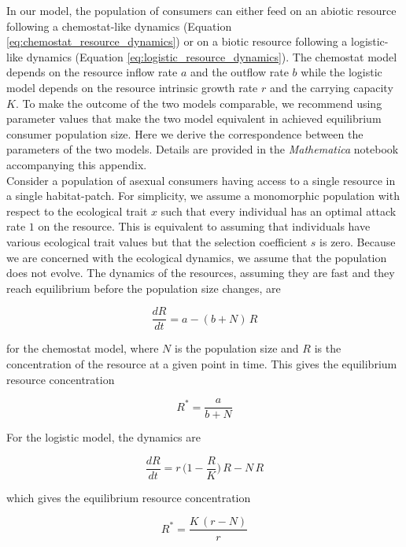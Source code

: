 In our model, the population of consumers can either feed on an abiotic resource following a chemostat-like dynamics (Equation \ref{eq:chemostat_resource_dynamics}) or on a biotic resource following a logistic-like dynamics (Equation \ref{eq:logistic_resource_dynamics}). The chemostat model depends on the resource inflow rate $a$ and the outflow rate $b$ while the logistic model depends on the resource intrinsic growth rate $r$ and the carrying capacity $K$. To make the outcome of the two models comparable, we recommend using parameter values that make the two model equivalent in achieved equilibrium consumer population size. Here we derive the correspondence between the parameters of the two models. Details are provided in the \textit{Mathematica} notebook accompanying this appendix.\\

Consider a population of asexual consumers having access to a single resource in a single habitat-patch. For simplicity, we assume a monomorphic population with respect to the ecological trait $x$ such that every individual has an optimal attack rate $1$ on the resource. This is equivalent to assuming that individuals have various ecological trait values but that the selection coefficient $s$ is zero. Because we are concerned with the ecological dynamics, we assume that the population does not evolve. The dynamics of the resources, assuming they are fast and they reach equilibrium before the population size changes, are

\begin{equation}
    \frac{dR}{dt} = a - (b + N)\,R
\end{equation}

for the chemostat model, where $N$ is the population size and $R$ is the concentration of the resource at a given point in time. This gives the equilibrium resource concentration

\begin{equation}
    R^* = \frac{a}{b+N}
\end{equation}

For the logistic model, the dynamics are

\begin{equation}
    \frac{dR}{dt} = r\,\bigg(1-\frac{R}{K}\bigg)\,R-N\,R
\end{equation}

which gives the equilibrium resource concentration

\begin{equation}
    R^* = \frac{K\,(r-N)}{r}
\end{equation}

